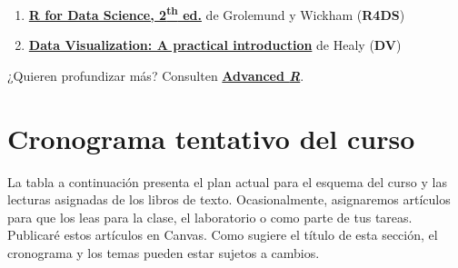 \documentclass[10pt]{article}
\begin{document}
	\begin{enumerate}
		\item \href{https://r4ds.hadley.nz/}{\textbf{R for Data Science, 2\textsuperscript{th} ed.}} de Grolemund y Wickham (\textbf{R4DS})
		\item \href{http://socviz.co/}{\textbf{Data Visualization: A practical introduction}} de Healy (\textbf{DV})
	\end{enumerate}
	
	¿Quieren profundizar más? Consulten \href{http://adv-r.had.co.nz/}{\textbf{Advanced \textit{R}}}.
	
	
	
	
	\section*{Cronograma tentativo del curso}
	
	La tabla a continuación presenta el plan actual para el esquema del curso y las lecturas asignadas de los libros de texto. Ocasionalmente, asignaremos artículos para que los leas para la clase, el laboratorio o como parte de tus tareas. Publicaré estos artículos en Canvas. Como sugiere el título de esta sección, el cronograma y los temas pueden estar sujetos a cambios.
	
\end{document}
